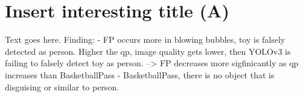 \section{Insert interesting title (A)}
\label{sec:results/section_a}

Text goes here.
Finding:
- FP occurs more in blowing bubbles, toy is falsely detected as person. Higher the qp, image quality gets lower, then YOLOv3 is failing to falsely detect toy as person. --> FP decreases more sigfinicantly as qp increases than BasketballPass
- BasketballPass, there is no object that is disguising or similar to person.